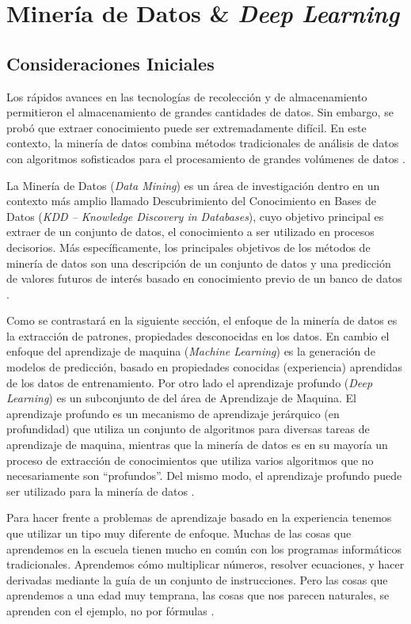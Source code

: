 \chapter{Minería de Datos \& \textit{Deep Learning}}\label{cap:deep_learning}

\section{Consideraciones Iniciales}

Los rápidos avances en las tecnologías de recolección y de almacenamiento permitieron el almacenamiento de grandes cantidades de datos. Sin embargo, se probó que extraer conocimiento puede ser extremadamente difícil. En este contexto, la minería de datos combina métodos tradicionales de análisis de datos con algoritmos sofisticados para el procesamiento de grandes volúmenes de datos \cite{Tan:2005:IDM:1095618}.

La Minería de Datos (\textit{Data Mining}) es un área de investigación dentro en un contexto más amplio llamado Descubrimiento del Conocimiento en Bases de Datos (\textit{KDD – Knowledge Discovery in Databases}), cuyo objetivo principal es extraer de un conjunto de datos, el conocimiento a ser utilizado en procesos decisorios. Más específicamente, los principales objetivos de los métodos de minería de datos son una descripción de un conjunto de datos y una predicción de valores futuros de interés basado en conocimiento previo de un banco de datos \cite{Fayyad:1996:DMK:257938.257942}.


Como se contrastará   en la siguiente sección,  el enfoque de la minería de datos es  la extracción de patrones, propiedades desconocidas en los datos. En cambio el enfoque del aprendizaje de maquina (\textit{Machine Learning}) es la generación  de modelos de predicción, basado en propiedades conocidas (experiencia) aprendidas de los datos de entrenamiento.   Por otro lado el aprendizaje profundo (\textit{Deep Learning}) es un subconjunto de  del área de Aprendizaje de Maquina. El aprendizaje profundo es un mecanismo de aprendizaje jerárquico (en profundidad) que utiliza un conjunto de algoritmos para diversas tareas de aprendizaje de maquina, mientras que la minería de datos es en su mayoría un proceso de extracción de conocimientos que utiliza varios algoritmos que no necesariamente son ``profundos''. Del mismo modo, el aprendizaje profundo puede ser utilizado para la minería de datos \cite{dlBook}. 
 
Para hacer frente a  problemas de aprendizaje basado en la experiencia  tenemos  que utilizar un tipo muy diferente de enfoque. Muchas de las cosas que aprendemos en la escuela tienen mucho en común con los programas informáticos tradicionales. Aprendemos cómo multiplicar números, resolver ecuaciones, y hacer derivadas mediante la guía de un conjunto de instrucciones. Pero las cosas que aprendemos a una edad muy temprana, las cosas que nos parecen naturales, se aprenden con el ejemplo, no por fórmulas \cite{dlBook}.
 
